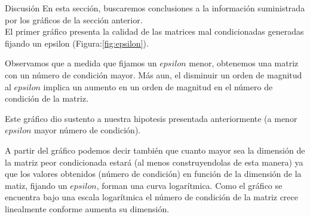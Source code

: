 \begin{section}{Discusión}
	En esta sección, buscaremos conclusiones a la información suministrada por los gráficos de la sección anterior.\\
	
	El primer gráfico presenta la calidad de las matrices mal condicionadas generadas fijando un epsilon (Figura:\ref{fig:epsilon}).
	
	Observamos que a medida que fijamos un $epsilon$ menor, obtenemos una matriz con un número de condición mayor. Más aun, el disminuir un orden de magnitud al $epsilon$ implica un aumento en un orden de magnitud en el número de condición de la matriz.
	
	Este gráfico dio sustento a nuestra hipotesis presentada anteriormente (a menor $epsilon$ mayor número de condición).
	
	A partir del gráfico podemos decir también que cuanto mayor sea la dimensión de la  matriz peor condicionada estará (al menos construyendolas de esta manera) ya que los valores obtenidos (número de condición) en función de la dimensión de la matiz, fijando un $epsilon$, forman una curva logarítmica. Como el gráfico se encuentra bajo una escala logarítmica el número de condición de la matriz crece linealmente conforme aumenta su dimensión.
\end{section}
